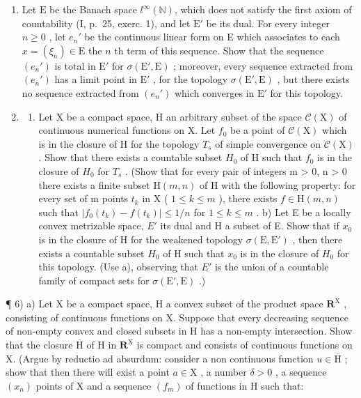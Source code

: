 \begin{enumerate}
\def\labelenumi{\arabic{enumi})}
\setcounter{enumi}{3}
\item
  Let \(\mathrm{E}\) be the Banach space \(l^{\infty}(\mathbb{N})\), which does not satisfy the first axiom of countability (I, p.~25, exerc. 1), and let \(\mathrm{E}'\) be its dual. For every integer \(n \geqslant 0\) , let \(e_n'\) be the continuous linear form on E which associates to each \(x = (\xi_n) \in \mathrm{E}\) the \(n\) th term of this sequence. Show that the sequence \((e_n')\) is total in \(\mathrm{E}'\) for \(\sigma(\mathrm{E}', \mathrm{E})\) ; moreover, every sequence extracted from \((e_n')\) has a limit point in \(\mathrm{E}'\) , for the topology \(\sigma(\mathrm{E}', \mathrm{E})\) , but there exists no sequence extracted from \((e_n')\) which converges in \(\mathrm{E}'\) for this topology.
\item
  \begin{enumerate}
  \def\labelenumii{\alph{enumii})}
  \tightlist
  \item
    Let X be a compact space, H an arbitrary subset of the space \(\mathcal{C}(\mathrm{X})\) of continuous numerical functions on X. Let \(f_{0}\) be a point of \(\mathcal{C}(\mathrm{X})\) which is in the closure of H for the topology \(T_{s}\) of simple convergence on \(\mathcal{C}(\mathrm{X})\) . Show that there exists a countable subset \(H_{0}\) of H such that \(f_{0}\) is in the closure of \(H_{0}\) for \(T_{s}\) . (Show that for every pair of integers m \textgreater{} 0, n \textgreater{} 0 there exists a finite subset \(\mathrm{H}(m, n)\) of H with the following property: for every set of m points \(t_{k}\) in X ( \(1 \leqslant k \leqslant m\) ), there exists \(f \in \mathrm{H}(m, n)\) such that \(|f_{0}(t_{k}) - f(t_{k})| \leqslant 1/n\) for \(1 \leqslant k \leqslant m\) . b) Let E be a locally convex metrizable space, \(E'\) its dual and H a subset of E. Show that if \(x_{0}\) is in the closure of H for the weakened topology \(\sigma(\mathrm{E}, \mathrm{E}')\) , then there exists a countable subset \(H_{0}\) of H such that \(x_{0}\) is in the closure of \(H_{0}\) for this topology. (Use a), observing that \(E'\) is the union of a countable family of compact sets for \(\sigma(\mathrm{E}', \mathrm{E})\) .)
  \end{enumerate}
\end{enumerate}

¶ 6) a) Let X be a compact space, H a convex subset of the product space \(\mathbf{R}^{\mathrm{X}}\) , consisting of continuous functions on X. Suppose that every decreasing sequence of non-empty convex and closed subsets in H has a non-empty intersection. Show that the closure \(\overline{\mathrm{H}}\) of H in \(\mathbf{R}^{\mathrm{X}}\) is compact and consists of continuous functions on X. (Argue by reductio ad absurdum: consider a non continuous function \(u \in \overline{\mathrm{H}}\) ; show that then there will exist a point \(a \in \mathrm{X}\) , a number \(\delta > 0\) , a sequence \((x_{n})\) points of X and a sequence \((f_{m})\) of functions in H such that:

